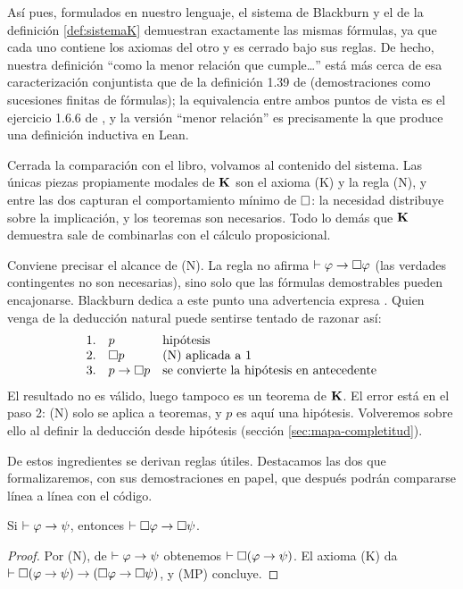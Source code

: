 Así pues, formulados en nuestro lenguaje, el sistema de Blackburn y el de la definición \ref{def:sistemaK} demuestran exactamente las mismas fórmulas, ya que cada uno contiene los axiomas del otro y es cerrado bajo sus reglas. De hecho, nuestra definición ``como la menor relación que cumple\dots'' está más cerca de esa caracterización conjuntista que de la definición 1.39 de \cite{blackburn} (demostraciones como sucesiones finitas de fórmulas); la equivalencia entre ambos puntos de vista es el ejercicio 1.6.6 de \cite{blackburn}, y la versión ``menor relación'' es precisamente la que produce una definición inductiva en Lean.

Cerrada la comparación con el libro, volvamos al contenido del sistema. Las únicas piezas propiamente modales de $\mathbf{K}$ son el axioma (K) y la regla (N), y entre las dos capturan el comportamiento mínimo de $\square$: la necesidad distribuye sobre la implicación, y los teoremas son necesarios. Todo lo demás que $\mathbf{K}$ demuestra sale de combinarlas con el cálculo proposicional.

Conviene precisar el alcance de (N). La regla no afirma $\vdash \varphi \to \square\varphi$ (las verdades contingentes no son necesarias), sino solo que las fórmulas demostrables pueden encajonarse. Blackburn dedica a este punto una advertencia expresa \cite[Obs.~1.41]{blackburn}. Quien venga de la deducción natural puede sentirse tentado de razonar así:
\[
\begin{array}{rll}
  1. & p & \text{hipótesis}\\
  2. & \square p & \text{(N) aplicada a 1}\\
  3. & p \to \square p & \text{se convierte la hipótesis en antecedente}
\end{array}
\]
El resultado no es válido, luego tampoco es un teorema de $\mathbf{K}$. El error está en el paso 2: (N) solo se aplica a teoremas, y $p$ es aquí una hipótesis. Volveremos sobre ello al definir la deducción desde hipótesis (sección \ref{sec:mapa-completitud}).

De estos ingredientes se derivan reglas útiles. Destacamos las dos que formalizaremos, con sus demostraciones en papel, que después podrán compararse línea a línea con el código.

\begin{proposicion}\label{prop:rm}
Si\/ $\vdash \varphi \to \psi$, entonces
$\vdash \square\varphi \to \square\psi$.
\end{proposicion}
\begin{proof}
Por (N), de $\vdash \varphi \to \psi$ obtenemos $\vdash \square(\varphi \to \psi)$. El axioma (K) da $\vdash \square(\varphi \to \psi) \to (\square\varphi \to \square\psi)$, y (MP) concluye.
\end{proof}

